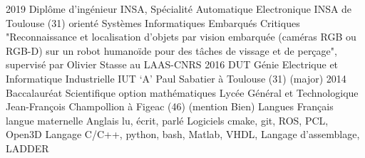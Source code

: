 \documentclass[11pt,a4paper,sans]{moderncv}         %
\begin{document}
%
\cventry
{2019}
{Dipl\^ome d'ing\'enieur INSA, Sp\'ecialit\'e Automatique Electronique}
{INSA de Toulouse (31)}
{orient\'e Syst\`emes Informatiques Embarqu\'es Critiques}
{}
{
  "Reconnaissance et localisation d’objets par vision embarqu\'ee (cam\'eras RGB ou RGB-D) sur un robot humano\"ide pour des t\^aches de vissage et de per\c cage", supervis\'e par Olivier Stasse au LAAS-CNRS
}
%
\cventry
{2016}
{DUT G\'enie Electrique et Informatique Industrielle}
{IUT `A' Paul Sabatier}
{\`a Toulouse (31)}
{(major)}
{}
%
\cventry
{2014}
{Baccalaur\'eat Scientifique option math\'ematiques}
{Lyc\'ee G\'en\'eral et Technologique Jean-Fran\c cois Champollion}
{\`a Figeac (46)}
{(mention Bien)}
{}
%
\vspace*{0.5cm}
\cventry
{Langues}
{Fran\c cais}
{langue maternelle}
{}
{}
{}
%
\cventry
{}
{Anglais}
{lu, \'ecrit, parl\'e}
{}
{}
{}
%
{Logiciels}
{cmake, git, ROS, PCL, Open3D}
{}
{}
{}
%
\cventry
{}
{Langage}
{C/C++, python, bash, Matlab, VHDL, Langage d'assemblage, LADDER}
{}
{}
{}
%
\end{document}
